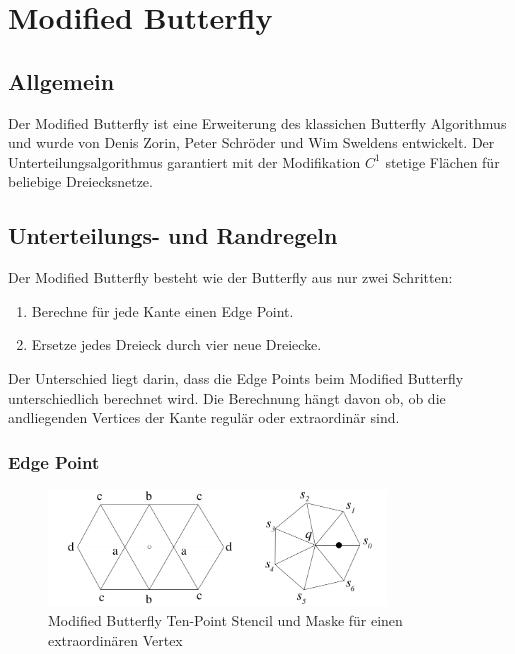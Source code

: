 \section{Modified Butterfly} \label{sec:modbutterfly}

\subsection{Allgemein}

Der Modified Butterfly ist eine Erweiterung des klassichen
Butterfly Algorithmus und wurde von Denis Zorin, Peter Schröder und Wim Sweldens entwickelt.
Der Unterteilungsalgorithmus garantiert mit der Modifikation \(C^1\) stetige Flächen
für beliebige Dreiecksnetze.
\cite[S. 72ff]{Zorin.subdivcourse}
\cite{Gamasutra}
\cite{Sharp}

\subsection{Unterteilungs- und Randregeln}

Der Modified Butterfly besteht wie der Butterfly aus nur zwei Schritten:
\begin{enumerate}
\item Berechne für jede Kante einen Edge Point.
\item Ersetze jedes Dreieck durch vier neue Dreiecke.
\end{enumerate}
Der Unterschied liegt darin, dass die Edge Points beim Modified Butterfly
unterschiedlich berechnet wird. Die Berechnung hängt davon ob,
ob die andliegenden Vertices der Kante regulär oder extraordinär sind.

\subsubsection*{Edge Point}

\begin{figure}
\centering
\includegraphics[width=0.8\textwidth]{content/media/sd_modbutterfly_mask.jpg}
\caption{Modified Butterfly Ten-Point Stencil und Maske für einen extraordinären Vertex
\cite{Zorin:1996:ISM:237170.237254}}
\label{fig:sd_modbutterfly_mask}
\end{figure}

